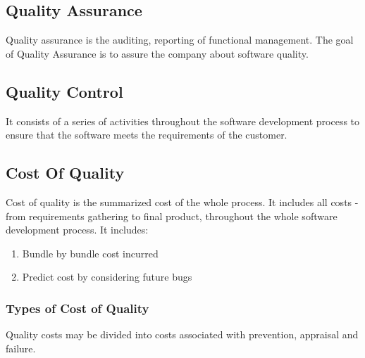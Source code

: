 \documentclass[11pt]{article}
\begin{document}
\subsection{Quality Assurance}
\label{sec:org57c335c}
Quality assurance is the auditing, reporting of functional management. 
The goal of Quality Assurance is to assure the company about software quality.

\subsection{Quality Control}
\label{sec:orgb2ef9e5}
It consists of a series of activities throughout the software development process to ensure that the software meets the requirements of the customer.

\subsection{Cost Of Quality}
\label{sec:org4c5128a}
Cost of quality is the summarized cost of the whole process. It includes all costs - from requirements gathering to final product, throughout the whole software development process. It includes:
\begin{enumerate}
\item Bundle by bundle cost incurred
\item Predict cost by considering future bugs
\end{enumerate}
\subsubsection{Types of Cost of Quality}
\label{sec:orgb84261f}
Quality costs may be divided into costs associated with prevention, appraisal and failure. 
\end{document}

